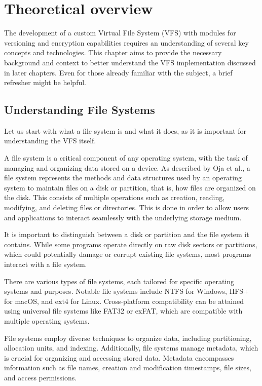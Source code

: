 \chapter{Theoretical overview}
\label{chap:refs}

The development of a custom Virtual File System (VFS) with modules for versioning and encryption capabilities requires an understanding of several key concepts and technologies.
This chapter aims to provide the necessary background and context to better understand the VFS implementation discussed in later chapters.
Even for those already familiar with the subject, a brief refresher might be helpful.


\section{Understanding File Systems}\label{sec:file-systems}

Let us start with what a file system is and what it does, as it is important for understanding the VFS itself.

A file system is a critical component of any operating system, with the task of managing and organizing data stored on a device.
As described by Oja et al.\cite{oja-fs}, a file system represents the methods and data structures used by an operating system to maintain files on a disk or partition, that is, how files are organized on the disk.
This consists of multiple operations such as creation, reading, modifying, and deleting files or directories.
This is done in order to allow users and applications to interact seamlessly with the underlying storage medium.

It is important to distinguish between a disk or partition and the file system it contains.
While some programs operate directly on raw disk sectors or partitions, which could potentially damage or corrupt existing file systems, most programs interact with a file system.

There are various types of file systems, each tailored for specific operating systems and purposes.
Notable file systems include NTFS for Windows, HFS+ for macOS, and ext4 for Linux.
Cross-platform compatibility can be attained using universal file systems like FAT32 or exFAT, which are compatible with multiple operating systems.

File systems employ diverse techniques to organize data, including partitioning, allocation units, and indexing.
Additionally, file systems manage metadata, which is crucial for organizing and accessing stored data.
Metadata encompasses information such as file names, creation and modification timestamps, file sizes, and access permissions.


